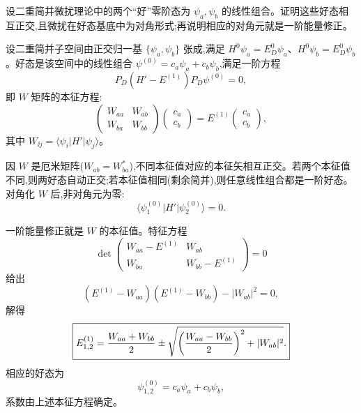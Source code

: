 \begin{question}
设二重简并微扰理论中的两个“好”零阶态为 $\psi_a,\psi_b$ 的线性组合。证明这些好态相互正交,且微扰在好态基底中为对角形式;再说明相应的对角元就是一阶能量修正。
\end{question}
\begin{solution}
设二重简并子空间由正交归一基 $\{\psi_a,\psi_b\}$ 张成,满足 $H^0\psi_a=E_D^0\psi_a$、$H^0\psi_b=E_D^0\psi_b$。好态是该空间中的线性组合 $\psi^{(0)}=c_a\psi_a+c_b\psi_b$,满足一阶方程
\[
P_D(H'-E^{(1)})P_D\psi^{(0)}=0,
\]
即 $W$ 矩阵的本征方程:
\[
\begin{pmatrix}W_{aa}&W_{ab}\\ W_{ba}&W_{bb}\end{pmatrix}
\begin{pmatrix}c_a\\c_b\end{pmatrix}
=E^{(1)}\begin{pmatrix}c_a\\c_b\end{pmatrix},
\]
其中 $W_{\ii j}=\langle\psi_i|H'|\psi_j\rangle$。

因 $W$ 是厄米矩阵($W_{ab}=W_{ba}^*$),不同本征值对应的本征矢相互正交。若两个本征值不同,则两好态自动正交;若本征值相同(剩余简并),则任意线性组合都是一阶好态。对角化 $W$ 后,非对角元为零:
\[
\langle\psi_1^{(0)}|H'|\psi_2^{(0)}\rangle=0.
\]

一阶能量修正就是 $W$ 的本征值。特征方程
\[
\det\begin{pmatrix}W_{aa}-E^{(1)}&W_{ab}\\ W_{ba}&W_{bb}-E^{(1)}\end{pmatrix}=0
\]
给出
\[
(E^{(1)}-W_{aa})(E^{(1)}-W_{bb})-|W_{ab}|^2=0,
\]
解得
\[
\boxed{E_{1,2}^{(1)}={W_{aa}+W_{bb}\over2}
\pm\sqrt{\left({W_{aa}-W_{bb}\over2}\right)^2+|W_{ab}|^2}.}
\]
相应的好态为
\[
\psi_{1,2}^{(0)}=c_a\psi_a+c_b\psi_b,
\]
系数由上述本征方程确定。
\end{solution}


